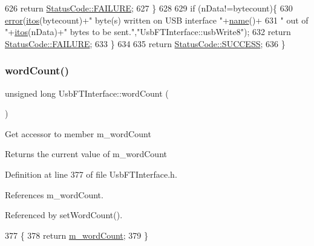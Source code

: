 \begin{DoxyCode}
626     \textcolor{keywordflow}{return} \hyperlink{classStatusCode_a6f565cbeadc76d14c72f047e5e85eb4ba3da73d4c469762eb9d3c960368252b26}{StatusCode::FAILURE};
627   \}
628 
629   \textcolor{keywordflow}{if} (nData!=bytecount)\{
630     \hyperlink{classObject_a204a95f57818c0f811933917a30eff45}{error}(\hyperlink{Tools_8h_af330027dbdafb9a30768b3613c553e60}{itos}(bytecount)+\textcolor{stringliteral}{" byte(s) written on USB interface "}+\hyperlink{classObject_a300f4c05dd468c7bb8b3c968868443c1}{name}()+
631             \textcolor{stringliteral}{" out of "}+\hyperlink{Tools_8h_af330027dbdafb9a30768b3613c553e60}{itos}(nData)+\textcolor{stringliteral}{" bytes to be sent."},\textcolor{stringliteral}{"UsbFTInterface::usbWrite8"});
632     \textcolor{keywordflow}{return} \hyperlink{classStatusCode_a6f565cbeadc76d14c72f047e5e85eb4ba3da73d4c469762eb9d3c960368252b26}{StatusCode::FAILURE};    
633   \}
634 
635   \textcolor{keywordflow}{return} \hyperlink{classStatusCode_a6f565cbeadc76d14c72f047e5e85eb4badd0da38d3ba0d922efd1f4619bc37ad8}{StatusCode::SUCCESS};  
636 \}
\end{DoxyCode}
\mbox{\label{classUsbFTInterface_a2acaf55e8c253f20e1f25a023c9238f4}} 
\subsubsection{\texorpdfstring{word\+Count()}{wordCount()}}
{\footnotesize\ttfamily unsigned long Usb\+F\+T\+Interface\+::word\+Count (\begin{DoxyParamCaption}{ }\end{DoxyParamCaption})\hspace{0.3cm}{\ttfamily [inline]}}

Get accessor to member m\+\_\+word\+Count \begin{DoxyReturn}{Returns}
the current value of m\+\_\+word\+Count 
\end{DoxyReturn}


Definition at line 377 of file Usb\+F\+T\+Interface.\+h.



References m\+\_\+word\+Count.



Referenced by set\+Word\+Count().


\begin{DoxyCode}
377                              \{
378     \textcolor{keywordflow}{return} \hyperlink{classUsbFTInterface_a91c81850db2579afa6a5296e0bf0dbef}{m\_wordCount};
379   \}
\end{DoxyCode}
\mbox{\label{classUsbFTInterface_add098ede127a2089e3ac8ea615ed6d46}} 

